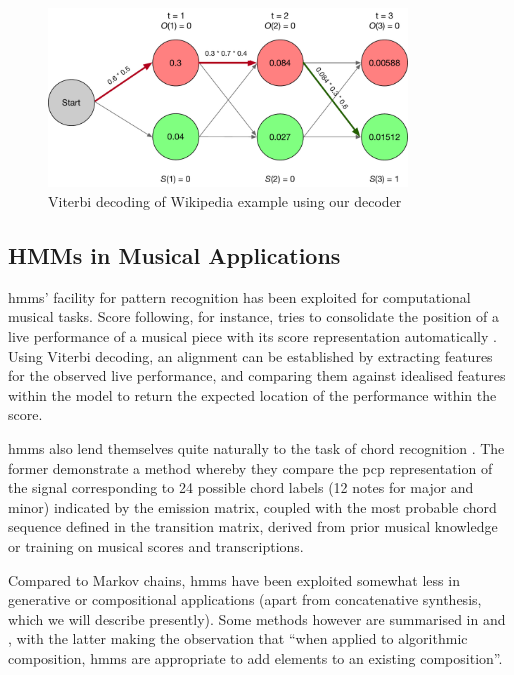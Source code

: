 {{{{{{{{\begin{figure}
	\begin{center}
		\includegraphics[width=0.85\textwidth]{ch05_pyconcat/figures/regular_viterbi.pdf}
	\end{center}
	\caption[Viterbi decoding of Wikipedia example using our decoder]{Viterbi decoding of Wikipedia example using our decoder}
	\label{fig:viterbi_basic}
\end{figure}

\subsection{HMMs in Musical Applications}

\acrshort{hmm}s' facility for pattern recognition has been exploited for computational musical tasks. Score following, for instance, tries to consolidate the position of a live performance of a musical piece with its score representation automatically \citep{Orio2003}. Using Viterbi decoding, an alignment can be established by extracting features for the observed live performance, and comparing them against idealised features within the model to return the expected location of the performance within the score.

\acrshort{hmm}s also lend themselves quite naturally to the task of chord recognition \citep{Papadopoulos2007, Cho2010, Sheh2003}. The former demonstrate a method whereby they compare the \acrshort{pcp} representation of the signal corresponding to 24 possible chord labels (12 notes for major and minor) indicated by the emission matrix, coupled with the most probable chord sequence defined in the transition matrix, derived from prior musical knowledge or training on musical scores and transcriptions.

Compared to Markov chains, \acrshort{hmm}s have been exploited somewhat less in generative or compositional applications (apart from concatenative synthesis, which we will describe presently). Some methods however are summarised in \citep{Fernandez2013} and \citep{Nierhaus2009}, with the latter making the observation that “when applied to algorithmic composition, \acrshort{hmm}s are appropriate to add elements to an existing composition”. 

}}}}}}}}
